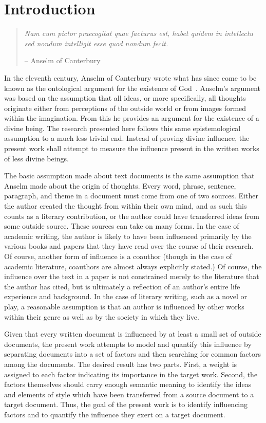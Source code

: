 \documentclass[../dissertation.tex]{subfiles}
\begin{document}

\chapter{Introduction}
\begin{quote}
\textit{Nam cum pictor praecogitat quae facturus est, habet quidem in
intellectu sed nondum intelligit esse quod nondum fecit.}

-- Anselm of Canterbury~\cite{anselm}
\end{quote}
In the eleventh century, Anselm of Canterbury wrote what has since
come to be known as the ontological argument for the existence of
God~\cite{anselm}.  Anselm's argument was based on the assumption that
all ideas, or more specifically, all thoughts originate either from
perceptions of the outside world or from images formed within the
imagination.  From this he provides an argument for the existence of
a divine being.  The research presented here follows this same
epistemological assumption to a much less trivial end.
Instead of proving divine influence, the present work shall attempt to
measure the influence present in the written works of less divine beings.

The basic assumption made about text documents is the same assumption
that Anselm made about the origin of thoughts.  Every word, phrase,
sentence, paragraph, and theme in a document must come from one of two
sources.  Either the author created the thought from within their own
mind, and as such this counts as a literary contribution, or the
author could have transferred ideas from some outside source.  These
sources can take on many forms.  In the case of academic writing, the
author is likely to have been influenced primarily by the various
books and papers that they have read over the course of their
research.  Of course, another form of influence is a coauthor (though
in the case of academic literature, coauthors are almost always
explicitly stated.)  Of course, the influence over the text in a paper
is not constrained merely to the literature that the author has cited,
but is ultimately a reflection of an author's entire life experience
and background.  In the case of literary writing, such as a novel or
play, a reasonable assumption is that an author is influenced by other
works within their genre as well as by the society in which they live.

Given that every written document is influenced by at least a small
set of outside documents, the present work attempts to model and
quantify this influence by separating documents into a set of factors
and then searching for common factors among the documents.  The
desired result has two parts.  First, a weight is assigned to each
factor indicating its importance in the target work.  Second, the
factors themselves should carry enough semantic meaning to identify
the ideas and elements of style which have been transferred from a
source document to a target document.  Thus, the goal of the present
work is to identify influencing factors and to quantify the influence
they exert on a target document.
\end{document}
